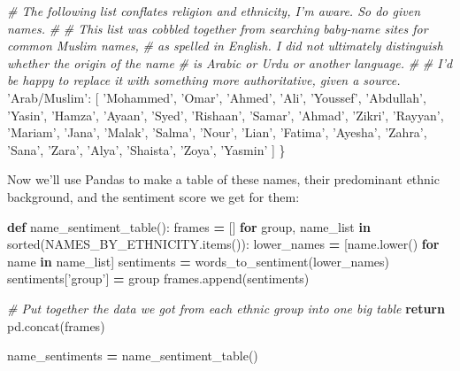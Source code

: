 \documentclass[]{book}
\newenvironment{Shaded}{\begin{snugshade}}{\end{snugshade}}
\newcommand{\KeywordTok}[1]{\textcolor[rgb]{0.13,0.29,0.53}{\textbf{#1}}}
\newcommand{\StringTok}[1]{\textcolor[rgb]{0.31,0.60,0.02}{#1}}
\newcommand{\CommentTok}[1]{\textcolor[rgb]{0.56,0.35,0.01}{\textit{#1}}}
\newcommand{\ControlFlowTok}[1]{\textcolor[rgb]{0.13,0.29,0.53}{\textbf{#1}}}
\newcommand{\OperatorTok}[1]{\textcolor[rgb]{0.81,0.36,0.00}{\textbf{#1}}}
\newcommand{\BuiltInTok}[1]{#1}
\newcommand{\NormalTok}[1]{#1}
\theoremstyle{definition}
\theoremstyle{definition}
\theoremstyle{definition}
\theoremstyle{remark}
\begin{document}
\begin{Shaded}
\begin{Highlighting}[]
    \CommentTok{# The following list conflates religion and ethnicity, I'm aware. So do given names.}
    \CommentTok{#}
    \CommentTok{# This list was cobbled together from searching baby-name sites for common Muslim names,}
    \CommentTok{# as spelled in English. I did not ultimately distinguish whether the origin of the name}
    \CommentTok{# is Arabic or Urdu or another language.}
    \CommentTok{#}
    \CommentTok{# I'd be happy to replace it with something more authoritative, given a source.}
    \StringTok{'Arab/Muslim'}\NormalTok{: [}
        \StringTok{'Mohammed'}\NormalTok{, }\StringTok{'Omar'}\NormalTok{, }\StringTok{'Ahmed'}\NormalTok{, }\StringTok{'Ali'}\NormalTok{, }\StringTok{'Youssef'}\NormalTok{, }\StringTok{'Abdullah'}\NormalTok{, }\StringTok{'Yasin'}\NormalTok{, }\StringTok{'Hamza'}\NormalTok{,}
        \StringTok{'Ayaan'}\NormalTok{, }\StringTok{'Syed'}\NormalTok{, }\StringTok{'Rishaan'}\NormalTok{, }\StringTok{'Samar'}\NormalTok{, }\StringTok{'Ahmad'}\NormalTok{, }\StringTok{'Zikri'}\NormalTok{, }\StringTok{'Rayyan'}\NormalTok{, }\StringTok{'Mariam'}\NormalTok{,}
        \StringTok{'Jana'}\NormalTok{, }\StringTok{'Malak'}\NormalTok{, }\StringTok{'Salma'}\NormalTok{, }\StringTok{'Nour'}\NormalTok{, }\StringTok{'Lian'}\NormalTok{, }\StringTok{'Fatima'}\NormalTok{, }\StringTok{'Ayesha'}\NormalTok{, }\StringTok{'Zahra'}\NormalTok{, }\StringTok{'Sana'}\NormalTok{,}
        \StringTok{'Zara'}\NormalTok{, }\StringTok{'Alya'}\NormalTok{, }\StringTok{'Shaista'}\NormalTok{, }\StringTok{'Zoya'}\NormalTok{, }\StringTok{'Yasmin'}
\NormalTok{    ]}
\NormalTok{\}}
\end{Highlighting}
\end{Shaded}

Now we'll use Pandas to make a table of these names, their predominant
ethnic background, and the sentiment score we get for them:

\begin{Shaded}
\begin{Highlighting}[]
\KeywordTok{def}\NormalTok{ name_sentiment_table():}
\NormalTok{    frames }\OperatorTok{=}\NormalTok{ []}
    \ControlFlowTok{for}\NormalTok{ group, name_list }\KeywordTok{in} \BuiltInTok{sorted}\NormalTok{(NAMES_BY_ETHNICITY.items()):}
\NormalTok{        lower_names }\OperatorTok{=}\NormalTok{ [name.lower() }\ControlFlowTok{for}\NormalTok{ name }\KeywordTok{in}\NormalTok{ name_list]}
\NormalTok{        sentiments }\OperatorTok{=}\NormalTok{ words_to_sentiment(lower_names)}
\NormalTok{        sentiments[}\StringTok{'group'}\NormalTok{] }\OperatorTok{=}\NormalTok{ group}
\NormalTok{        frames.append(sentiments)}

    \CommentTok{# Put together the data we got from each ethnic group into one big table}
    \ControlFlowTok{return}\NormalTok{ pd.concat(frames)}

\NormalTok{name_sentiments }\OperatorTok{=}\NormalTok{ name_sentiment_table()}
\end{Highlighting}
\end{Shaded}
\end{document}
